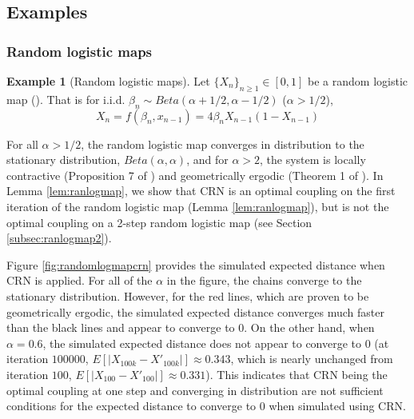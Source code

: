\documentclass[12pt]{article}
\theoremstyle{plain}%
\theoremstyle{definition}
\newtheorem{example}{Example}[section]
\begin{document}
\subsection{Examples}

\subsubsection{Random logistic maps}

\begin{example}[Random logistic maps]\label{ex:randomlogmap}
	Let $\{X_n\}_{n\geq 1}\in [0,1]$ be a random logistic map (\cite{localcont,wasandoneshot}). That is for i.i.d. $\beta_n\sim Beta(\alpha+1/2,\alpha-1/2)$ ($\alpha>1/2$), 
	$$X_n=f(\beta_n,x_{n-1})=4\beta_n X_{n-1}(1-X_{n-1})$$
\end{example}

For all $\alpha>1/2$, the random logistic map converges in distribution to the stationary distribution,  $Beta(\alpha,\alpha)$, and for $\alpha>2$, the system is locally contractive  (Proposition 7 of \cite{localcont}) and geometrically ergodic (Theorem 1 of \cite{localcont}). In Lemma \ref{lem:ranlogmap}, we show that CRN is an optimal coupling on the first iteration of the random logistic map (Lemma \ref{lem:ranlogmap}), but is not the optimal coupling on a 2-step random logistic map (see Section \ref{subsec:ranlogmap2}). 

Figure \ref{fig:randomlogmapcrn} provides the simulated expected distance when CRN is applied. For all of the $\alpha$ in the figure, the chains converge to the stationary distribution. However, for the red lines, which are proven to be geometrically ergodic, the simulated expected distance converges much faster than the black lines and appear to converge to 0. On the other hand, when $\alpha=0.6$, the simulated expected distance does not appear to converge to 0 (at iteration $100 000$, $E[|X_{100k}-X'_{100k}|]\approx 0.343$, which is nearly unchanged from iteration $100$, $E[|X_{100}-X'_{100}|]\approx 0.331$). This indicates that CRN being the optimal coupling at one step and converging in distribution are not sufficient conditions for the expected distance to converge to 0 when simulated using CRN.
\end{document}
